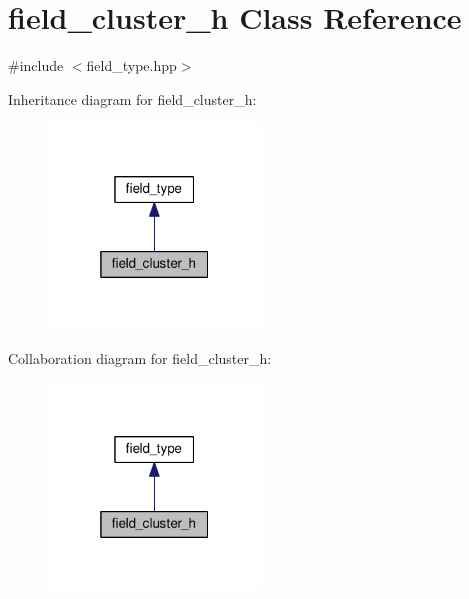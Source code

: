 \hypertarget{classfield__cluster__h}{}\section{field\+\_\+cluster\+\_\+h Class Reference}
\label{classfield__cluster__h}


{\ttfamily \#include $<$field\+\_\+type.\+hpp$>$}



Inheritance diagram for field\+\_\+cluster\+\_\+h\+:
\nopagebreak
\begin{figure}[H]
\begin{center}
\leavevmode
\includegraphics[width=160pt]{d0/d12/classfield__cluster__h__inherit__graph}
\end{center}
\end{figure}


Collaboration diagram for field\+\_\+cluster\+\_\+h\+:
\nopagebreak
\begin{figure}[H]
\begin{center}
\leavevmode
\includegraphics[width=160pt]{d3/dd8/classfield__cluster__h__coll__graph}
\end{center}
\end{figure}
